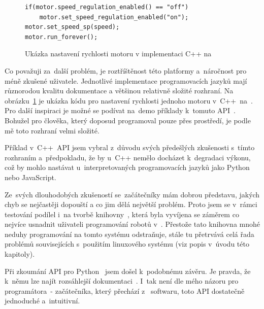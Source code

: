 \begin{figure}[H] 
	\begin{verbatim}
if(motor.speed_regulation_enabled() == "off")
    motor.set_speed_regulation_enabled("on");
motor.set_speed_sp(speed);
motor.run_forever();
	\end{verbatim}
	\caption{Ukázka nastavení rychlosti motoru v implementaci C++ na \evThreeDev}
	\label{src:ev3dev-lang-cpp_drive-test}
\end{figure}

Co považuji za~další problém, je roztříštěnost této platformy a~náročnost pro méně zkušené uživatele. 
Jednotlivé implementace programovacích jazyků mají různorodou kvalitu dokumentace a většinou relativně složité rozhraní. 
Na obrázku~\ref{src:ev3dev-lang-cpp_drive-test} je ukázka kódu pro nastavení rychlosti jednoho motoru v~C++~na~\evThreeDev{}. 
Pro další inspiraci je možné se podívat na~demo příklady k~tomuto API~\cite{legoMindstormsEV3_ev3dev-lang-cpp_drive-test}.
Bohužel pro člověka, který doposud programoval pouze přes \lego{} prostředí, je podle mě toto rozhraní velmi složité.

Příklad v~C++~API jsem vybral z~důvodu svých předešlých zkušenosti s~tímto rozhraním a~předpokladu, že by u~C++ nemělo docházet k~degradaci výkonu, což by mohlo nastávat u~interpretovaných programovacích jazyků jako Python nebo JavaScript.

Ze~svých dlouhodobých zkušeností se~začátečníky mám dobrou představu, jakých chyb se nejčastěji dopouští a co jim dělá největší problém.
Proto jsem se v~rámci testování \evThreeDev{} podílel i~na tvorbě knihovny~\cite{legoMindstormsEV3_ev3dev_RB-ev3dev-cpp-lib}, která byla vyvíjena se záměrem co nejvíce usnadnit uživateli programování robotů v~\evThreeDev{}. 
Přestože tato knihovna mnohé neduhy programování na tomto systému odstraňuje, stále tu přetrvává celá řada problémů souvisejících s~použitím linuxového systému (viz popis v~úvodu této kapitoly).


Při zkoumání API pro Python~\cite{legoMindstormsEV3_ev3dev-lang-python} jsem došel k~podobnému závěru. 
Je pravda, že k~němu lze najít rozsáhlejší dokumentaci~\cite{legoMindstormsEV3_ev3dev-lang-python-docs}. 
I~tak není dle mého názoru pro programátora~- začátečníka, který přechází z~\lego{}  softwaru, toto API dostatečně jednoduché a~intuitivní.


